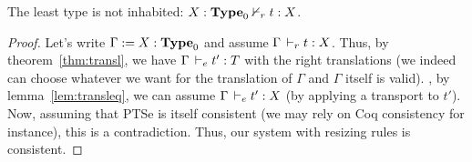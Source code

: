 \documentclass[a4paper,english]{lipics-utf8x}
\begin{document}
  \begin{corollary}[Consistency]
    The least type is not inhabited: $X : \operatorname{\mathbf{Type}}_0 \nvdash_r t : X$.
  \end{corollary}

  \begin{proof}
    Let's write $\Gamma := X : \operatorname{\mathbf{Type}}_0$ and assume $\Gamma \,\vdash_r t : X$.
    Thus, by theorem~\ref{thm:transl}, we have $\Gamma \,\vdash_e t' : T$ with
    the right translations (we indeed can choose whatever we want for the
    translation of $\Gamma$ and $\Gamma$ itself is valid).
    \Wlog, by lemma~\ref{lem:transleq}, we can assume
    $\Gamma \,\vdash_e t' : X$ (by applying a transport to $t'$).
    Now, assuming that PTSe is itself consistent (we may rely on Coq consistency
    for instance), this is a contradiction.
    Thus, our system with resizing rules is consistent.
  \end{proof}
\end{document}
